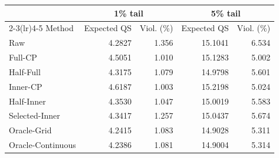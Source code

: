 \begin{tabular}{lrrrr}
\toprule
& \multicolumn{2}{c}{1\% tail} & \multicolumn{2}{c}{5\% tail} \\
\cmidrule(lr){2-3}\cmidrule(lr){4-5}
Method & Expected QS & Viol. (\%) & Expected QS & Viol. (\%) \\
\midrule
Raw & 4.2827 & 1.356 & 15.1041 & 6.534 \\
Full-CP & 4.5051 & 1.010 & 15.1283 & 5.002 \\
Half-Full & 4.3175 & 1.079 & 14.9798 & 5.601 \\
Inner-CP & 4.6187 & 1.003 & 15.2198 & 5.024 \\
Half-Inner & 4.3530 & 1.047 & 15.0019 & 5.583 \\
Selected-Inner & 4.3417 & 1.257 & 15.0437 & 5.674 \\
\midrule
Oracle-Grid & 4.2415 & 1.083 & 14.9028 & 5.311 \\
Oracle-Continuous & 4.2386 & 1.081 & 14.9004 & 5.314 \\
\bottomrule
\end{tabular}
